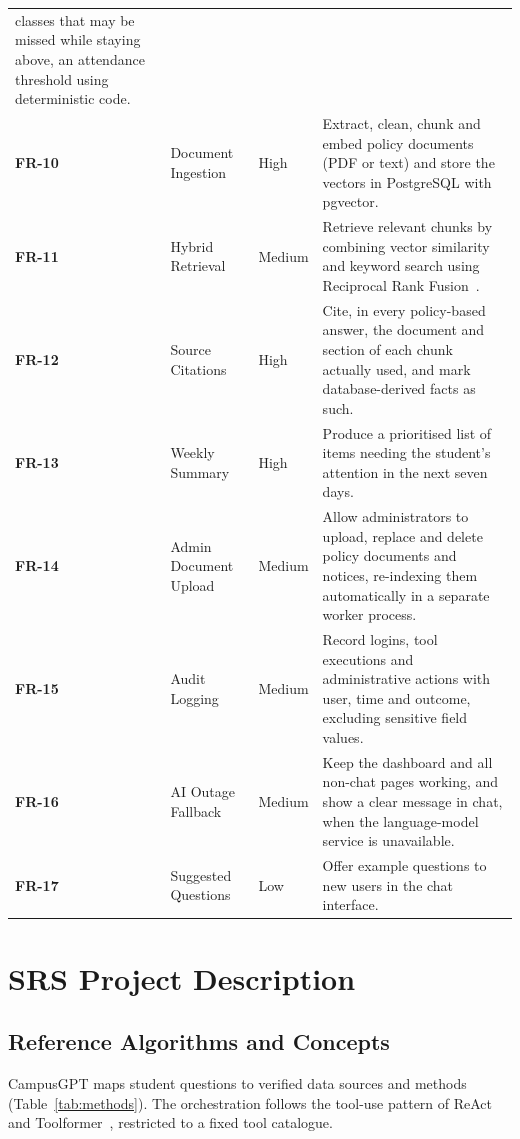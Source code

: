 \documentclass[11pt,a4paper,oneside]{report}
\begin{document}
\begin{longtable}{@{}>{\raggedright\arraybackslash}p{1.5cm}>{\raggedright\arraybackslash}p{3.4cm}>{\raggedright\arraybackslash}p{1.7cm}>{\raggedright\arraybackslash}p{7.4cm}@{}}
classes that may be missed while staying above, an attendance threshold using
deterministic code.\\
\textbf{FR-10} & Document Ingestion & High & Extract, clean, chunk and embed policy
documents (PDF or text) and store the vectors in PostgreSQL with pgvector.\\
\textbf{FR-11} & Hybrid Retrieval & Medium & Retrieve relevant chunks by combining vector
similarity and keyword search using Reciprocal Rank Fusion~\cite{cormack2009rrf}.\\
\textbf{FR-12} & Source Citations & High & Cite, in every policy-based answer, the
document and section of each chunk actually used, and mark database-derived facts as such.\\
\textbf{FR-13} & Weekly Summary & High & Produce a prioritised list of items needing the
student's attention in the next seven days.\\
\textbf{FR-14} & Admin Document Upload & Medium & Allow administrators to upload, replace
and delete policy documents and notices, re-indexing them automatically in a separate worker
process.\\
\textbf{FR-15} & Audit Logging & Medium & Record logins, tool executions and administrative
actions with user, time and outcome, excluding sensitive field values.\\
\textbf{FR-16} & AI Outage Fallback & Medium & Keep the dashboard and all non-chat pages
working, and show a clear message in chat, when the language-model service is unavailable.\\
\textbf{FR-17} & Suggested Questions & Low & Offer example questions to new users in the
chat interface.\\
\end{longtable}

\chapter{SRS Project Description}

\section{Reference Algorithms and Concepts}
CampusGPT maps student questions to verified data sources and methods
(Table~\ref{tab:methods}). The orchestration follows the tool-use pattern of
ReAct~\cite{yao2023react} and Toolformer~\cite{schick2023toolformer}, restricted to a fixed
tool catalogue.
\end{document}

